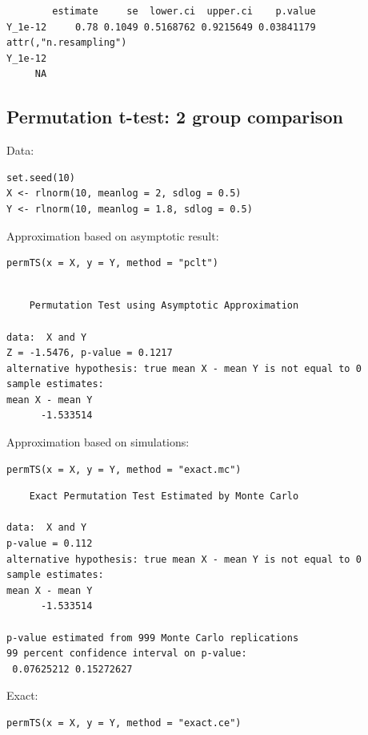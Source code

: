 \documentclass{article}
\begin{document}
\begin{verbatim}
        estimate     se  lower.ci  upper.ci    p.value
Y_1e-12     0.78 0.1049 0.5168762 0.9215649 0.03841179
attr(,"n.resampling")
Y_1e-12 
     NA
\end{verbatim}

\subsection{Permutation t-test: 2 group comparison}
\label{sec:orgb83d79e}

Data:
\lstset{language=r,label= ,caption= ,captionpos=b,numbers=none}
\begin{lstlisting}
set.seed(10)
X <- rlnorm(10, meanlog = 2, sdlog = 0.5)
Y <- rlnorm(10, meanlog = 1.8, sdlog = 0.5)
\end{lstlisting}

Approximation based on asymptotic result:
\lstset{language=r,label= ,caption= ,captionpos=b,numbers=none}
\begin{lstlisting}
permTS(x = X, y = Y, method = "pclt")
\end{lstlisting}

\begin{verbatim}

	Permutation Test using Asymptotic Approximation

data:  X and Y
Z = -1.5476, p-value = 0.1217
alternative hypothesis: true mean X - mean Y is not equal to 0
sample estimates:
mean X - mean Y 
      -1.533514
\end{verbatim}

Approximation based on simulations:
\lstset{language=r,label= ,caption= ,captionpos=b,numbers=none}
\begin{lstlisting}
permTS(x = X, y = Y, method = "exact.mc")
\end{lstlisting}

\begin{verbatim}
	Exact Permutation Test Estimated by Monte Carlo

data:  X and Y
p-value = 0.112
alternative hypothesis: true mean X - mean Y is not equal to 0
sample estimates:
mean X - mean Y 
      -1.533514 

p-value estimated from 999 Monte Carlo replications
99 percent confidence interval on p-value:
 0.07625212 0.15272627
\end{verbatim}

Exact:
\lstset{language=r,label= ,caption= ,captionpos=b,numbers=none}
\begin{lstlisting}
permTS(x = X, y = Y, method = "exact.ce")
\end{lstlisting}
\end{document}
